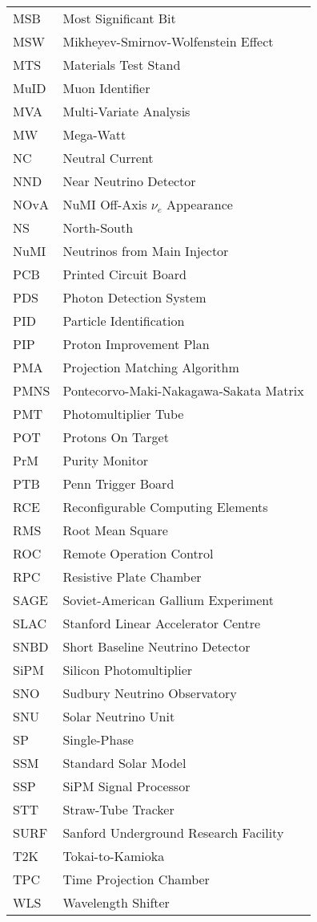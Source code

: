 \begin{longtable}{l p{11cm}}
MSB         & Most Significant Bit \\
MSW         & Mikheyev-Smirnov-Wolfenstein Effect \\
MTS         & Materials Test Stand \\
MuID        & Muon Identifier \\
MVA         & Multi-Variate Analysis \\
MW          & Mega-Watt \\
NC          & Neutral Current \\
NND         & Near Neutrino Detector \\
NOvA        & NuMI Off-Axis $\nu_e$ Appearance \\
NS          & North-South \\
NuMI        & Neutrinos from Main Injector \\
PCB         & Printed Circuit Board \\
PDS         & Photon Detection System \\
PID         & Particle Identification \\
PIP         & Proton Improvement Plan \\
PMA         & Projection Matching Algorithm \\
PMNS        & Pontecorvo-Maki-Nakagawa-Sakata Matrix \\
PMT         & Photomultiplier Tube \\
POT         & Protons On Target \\
PrM         & Purity Monitor \\
PTB         & Penn Trigger Board \\
RCE         & Reconfigurable Computing Elements \\
RMS         & Root Mean Square \\
ROC         & Remote Operation Control \\
RPC         & Resistive Plate Chamber \\
SAGE        & Soviet-American Gallium Experiment \\
SLAC        & Stanford Linear Accelerator Centre \\
SNBD        & Short Baseline Neutrino Detector \\
SiPM        & Silicon Photomultiplier \\
SNO         & Sudbury Neutrino Observatory \\
SNU         & Solar Neutrino Unit \\
SP          & Single-Phase \\
SSM         & Standard Solar Model \\
SSP         & SiPM Signal Processor \\
STT         & Straw-Tube Tracker \\
SURF        & Sanford Underground Research Facility \\
T2K         & Tokai-to-Kamioka \\
TPC         & Time Projection Chamber \\
WLS         & Wavelength Shifter \\
\end{longtable}


